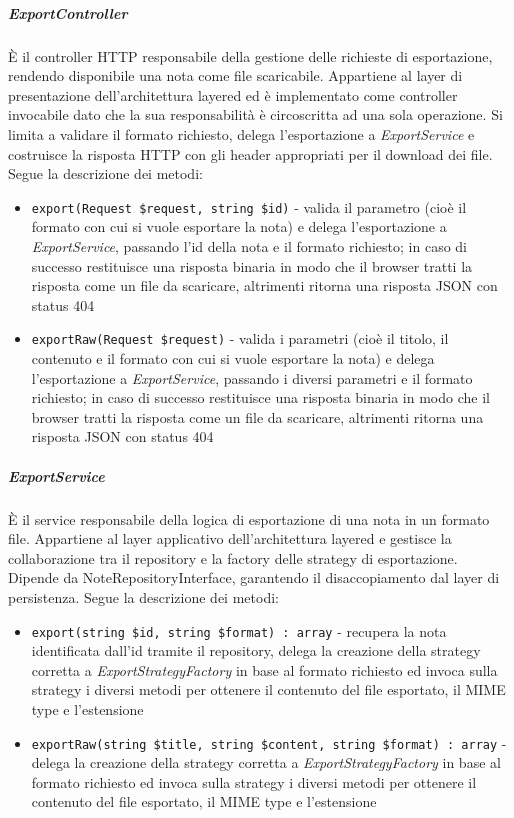 \documentclass[a4paper,10pt]{article}
\begin{document}
\subparagraph{ExportController} È il controller HTTP responsabile della gestione delle richieste di esportazione, rendendo disponibile una nota come file scaricabile. Appartiene al layer di presentazione dell'architettura layered ed è implementato come controller invocabile dato che la sua responsabilità è circoscritta ad una sola operazione. Si limita a validare il formato richiesto, delega l'esportazione a \textit{ExportService} e costruisce la risposta HTTP con gli header appropriati per il download dei file. Segue la descrizione dei metodi:
\begin{itemize}
    \item \texttt{export(Request \$request, string \$id)} - valida il parametro (cioè il formato con cui si vuole esportare la nota) e delega l'esportazione a \textit{ExportService}, passando l'id della nota e il formato richiesto; in caso di successo restituisce una risposta binaria in modo che il browser tratti la risposta come un file da scaricare, altrimenti ritorna una risposta JSON con status 404
    \item \texttt{exportRaw(Request \$request)} - valida i parametri (cioè il titolo, il contenuto e il formato con cui si vuole esportare la nota) e delega l'esportazione a \textit{ExportService}, passando i diversi parametri e il formato richiesto; in caso di successo restituisce una risposta binaria in modo che il browser tratti la risposta come un file da scaricare, altrimenti ritorna una risposta JSON con status 404
\end{itemize}
\subparagraph{ExportService} È il service responsabile della logica di esportazione di una nota in un formato file. Appartiene al layer applicativo dell'architettura layered e gestisce la collaborazione tra il repository e la factory delle strategy di esportazione. Dipende da NoteRepositoryInterface, garantendo il disaccopiamento dal layer di persistenza. Segue la descrizione dei metodi:
\begin{itemize}
    \item \texttt{export(string \$id, string \$format) : array} - recupera la nota identificata dall'id tramite il repository, delega la creazione della strategy corretta a \textit{ExportStrategyFactory} in base al formato richiesto ed invoca sulla strategy i diversi metodi per ottenere il contenuto del file esportato, il MIME type e l'estensione
    \item \texttt{exportRaw(string \$title, string \$content, string \$format) : array} - delega la creazione della strategy corretta a \textit{ExportStrategyFactory} in base al formato richiesto ed invoca sulla strategy i diversi metodi per ottenere il contenuto del file esportato, il MIME type e l'estensione
\end{itemize}
\end{document}
